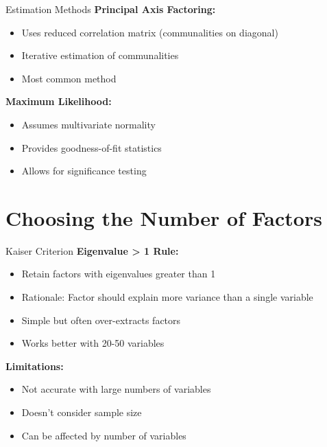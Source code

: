 \documentclass[aspectratio=169]{beamer}
\begin{document}
\begin{frame}{Estimation Methods}
  \textbf{Principal Axis Factoring:}
  \begin{itemize}
    \item Uses reduced correlation matrix (communalities on diagonal)
    \item Iterative estimation of communalities
    \item Most common method
  \end{itemize}
  
  \textbf{Maximum Likelihood:}
  \begin{itemize}
    \item Assumes multivariate normality
    \item Provides goodness-of-fit statistics
    \item Allows for significance testing
  \end{itemize}
\end{frame}


\section{Choosing the Number of Factors}
\begin{frame}
  \sectionpage
\end{frame}

\begin{frame}{Kaiser Criterion}
  \textbf{Eigenvalue > 1 Rule:}
  \begin{itemize}
    \item Retain factors with eigenvalues greater than 1
    \item Rationale: Factor should explain more variance than a single variable
    \item Simple but often over-extracts factors
    \item Works better with 20-50 variables
  \end{itemize}
  
  \textbf{Limitations:}
  \begin{itemize}
    \item Not accurate with large numbers of variables
    \item Doesn't consider sample size
    \item Can be affected by number of variables
  \end{itemize}
\end{frame}
\end{document}
